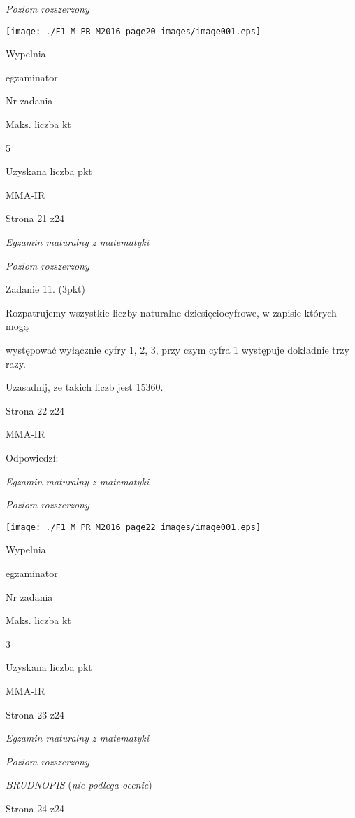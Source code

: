 \documentclass[a4paper,12pt]{article}
\begin{document}
{\it Poziom rozszerzony}
\begin{center}
\texttt{[image: ./F1\_M\_PR\_M2016\_page20\_images/image001.eps]}
\end{center}
Wypelnia

egzaminator

Nr zadania

Maks. liczba kt

5

Uzyskana liczba pkt

MMA-IR

Strona 21 z24





{\it Egzamin maturalny z matematyki}

{\it Poziom rozszerzony}

Zadanie 11. (3pkt)

Rozpatrujemy wszystkie liczby naturalne dziesięciocyfrowe, w zapisie których mogą

występować wyłącznie cyfry 1, 2, 3, przy czym cyfra 1 występuje dokładnie trzy razy.

Uzasadnij, $\dot{\mathrm{z}}\mathrm{e}$ takich liczb jest 15360.

Strona 22 z24

MMA-IR





Odpowiedzí:

{\it Egzamin maturalny z matematyki}

{\it Poziom rozszerzony}
\begin{center}
\texttt{[image: ./F1\_M\_PR\_M2016\_page22\_images/image001.eps]}
\end{center}
Wypelnia

egzaminator

Nr zadania

Maks. liczba kt

3

Uzyskana liczba pkt

MMA-IR

Strona 23 z24





{\it Egzamin maturalny z matematyki}

{\it Poziom rozszerzony}

{\it BRUDNOPIS} ({\it nie podlega ocenie})

Strona 24 z24
\end{document}
